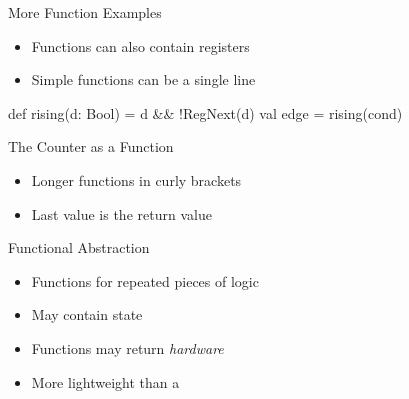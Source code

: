 \begin{frame}[fragile]{More Function Examples}
\begin{itemize}
\item Functions can also contain registers
\item Simple functions can be a single line
\end{itemize}

\begin{chisel}
  def rising(d: Bool) = d && !RegNext(d)
  val edge = rising(cond)
\end{chisel}
\end{frame}

\begin{frame}[fragile]{The Counter as a Function}
\begin{itemize}
\item Longer functions in curly brackets
\item Last value is the return value
\end{itemize}
\end{frame}

\begin{frame}[fragile]{Functional Abstraction}
\begin{itemize}
\item Functions for repeated pieces of logic
\item May contain state
\item Functions may return \emph{hardware}
\item More lightweight than a 
\end{itemize}
\end{frame}


